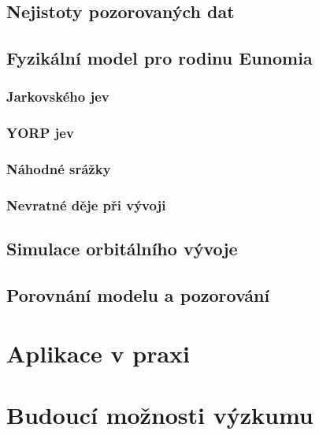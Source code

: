 \documentclass[A4paper, 12pt, oneside]{book}
\begin{document}
\section{Nejistoty pozorovaných dat}
\section{Fyzikální model pro rodinu Eunomia}
\subsection{Jarkovského jev}
\subsection{YORP jev}
\subsection{Náhodné srážky}
\subsection{Nevratné děje při vývoji}
\section{Simulace orbitálního vývoje}
\section{Porovnání modelu a pozorování}

\chapter{Aplikace v praxi}
\chapter{Budoucí možnosti výzkumu}
\printbibliography
\end{document}
